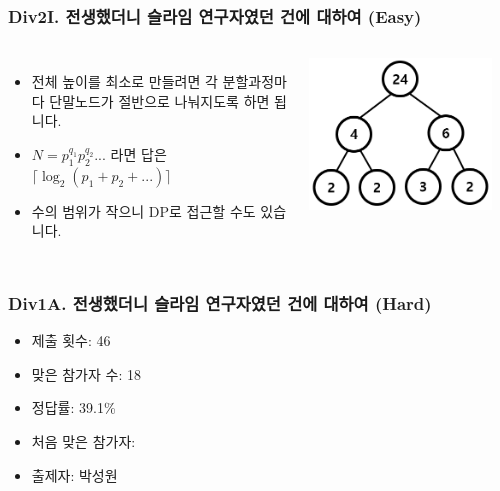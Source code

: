 \documentclass[xetex]{beamer}
\begin{document}
\begin{frame}
  \frametitle{Div2I. 전생했더니 슬라임 연구자였던 건에 대하여 (Easy)}
  \begin{columns}
      \begin{itemize}
        \item 전체 높이를 최소로 만들려면 각 분할과정마다 단말노드가 절반으로 나눠지도록 하면 됩니다.
        \item $N = p_1^{q_1} p_2^{q_2} ...$ 라면 답은 $\lceil \log_2(p_1 + p_2 + ...) \rceil$
        \item 수의 범위가 작으니 DP로 접근할 수도 있습니다.
      \end{itemize}
      \includegraphics[width=0.9\textwidth]{slime-sol-1.png}
  \end{columns}
\end{frame}

\begin{frame}
  \frametitle{Div1A. 전생했더니 슬라임 연구자였던 건에 대하여 (Hard)}
  \begin{itemize}
    \item 제출 횟수: 46
    \item 맞은 참가자 수: 18
    \item 정답률: 39.1\%
    \item 처음 맞은 참가자: 
    \item 출제자: 박성원
  \end{itemize}
\end{frame}
\end{document}
